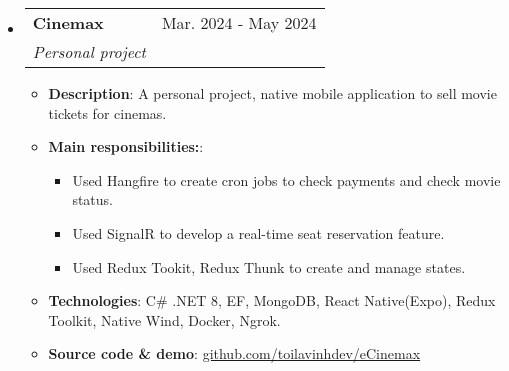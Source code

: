 \documentclass[letterpaper,11pt]{article}
\makeatletter
\newcommand{\resumeItem}[1]{
  \item\small{
    {#1 \vspace{-2pt}}
  }
}
\newcommand{\resumeSubheading}[4]{
  \vspace{-2pt}
  \item
    \begin{tabular*}{0.97\textwidth}[t]{l@{\extracolsep{\fill}}r}
      \textbf{#1} & #2 \\
      \textit{\small#3} & \textit{\small #4} \\
    \end{tabular*}
    \vspace{-7pt}
}
\newcommand{\resumeSubHeadingListStart} {
    \begin{itemize}[leftmargin=0.15in, label={}]
}
\newcommand{\resumeSubHeadingListEnd} {
    \end{itemize}
}
\newcommand{\resumeItemListStart} {
    \begin{itemize}
}
\newcommand{\resumeItemListEnd} {
    \end{itemize} 
    \vspace{-5pt}
}
\makeatother
\begin{document}
        \resumeSubHeadingListStart
            \resumeSubheading {Cinemax} {Mar. 2024 - May 2024} {Personal project} {}
            \resumeItemListStart
                \resumeItem{\textbf{Description}: A personal project, native mobile application to sell movie tickets for cinemas.}
                \resumeItem{\textbf{Main responsibilities:}:}
                \resumeItemListStart
                    \resumeItem{Used Hangfire to create cron jobs to check payments and check movie status.}
                    \resumeItem{Used SignalR to develop a real-time seat reservation feature.}
                    \resumeItem{Used Redux Tookit, Redux Thunk to create and manage states.}
                \resumeItemListEnd
                \vspace{0.2cm}
                \resumeItem{\textbf{Technologies}: C\# .NET 8, EF, MongoDB, React Native(Expo), Redux Toolkit, Native Wind, Docker, Ngrok.}
                \resumeItem{
                    \textbf{Source code \& demo}: \href{https://github.com/toilavinhdev/eCinemax}{\underline{github.com/toilavinhdev/eCinemax}}
                }
            \resumeItemListEnd
        \resumeSubHeadingListEnd
        
\end{document}
